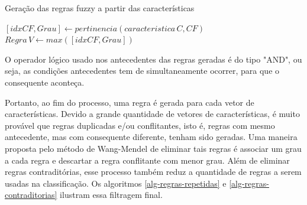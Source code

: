 \documentclass[template.tex]{subfiles}
\begin{document}
\begin{algorithm}
\begin{algorithmic}[1]
\caption{Geração das regras fuzzy a partir das características}
\label{alg-graus}
      \STATE $[idxCF,Grau] \leftarrow pertinencia(caracteristica\,C,CF)$
      \ENDFOR
   \STATE $Regra \, V \leftarrow max([idxCF,Grau]) $
   \ENDFOR
\ENDFOR
\end{algorithmic}
\end{algorithm}




O operador lógico usado nos antecedentes das regras geradas é do tipo "AND", ou seja, as condições antecedentes tem de simultaneamente ocorrer, para que o consequente aconteça.

Portanto, ao fim do processo, uma regra é gerada para cada vetor de características. Devido a grande quantidade de vetores de características, é muito provável que regras duplicadas e/ou conflitantes, isto é, regras com mesmo antecedente, mas com consequente diferente, tenham sido geradas. Uma maneira proposta pelo método de Wang-Mendel de eliminar tais regras é associar um grau a cada regra e descartar a regra conflitante com menor grau. Além de eliminar regras contraditórias, esse processo também reduz a quantidade de regras a serem usadas na classificação. Os algoritmos \ref{alg-regras-repetidas} e \ref{alg-regras-contraditorias} ilustram essa filtragem final.
\end{document}
